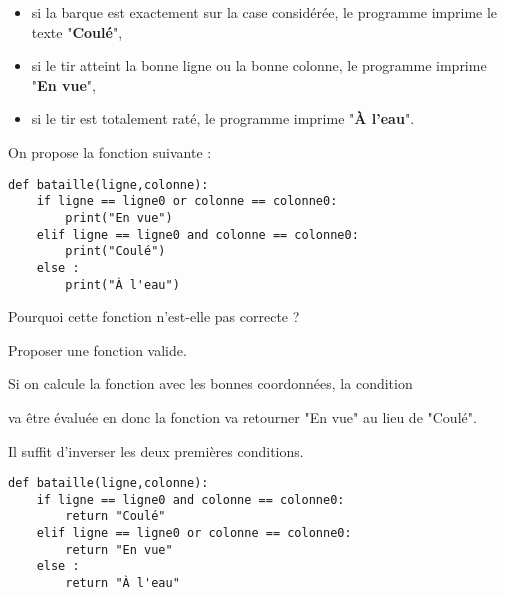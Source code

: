 \begin{itemize}
	\item si la barque est exactement sur la case considérée, le programme imprime le texte "{\bf Coulé}",
	\item si le tir atteint la bonne ligne ou la bonne colonne, le programme imprime "{\bf En vue}",
	\item si le tir est totalement raté, le programme imprime "{\bf À l'eau}".
\end{itemize}

On propose la fonction suivante :

\begin{lstlisting}
def bataille(ligne,colonne):
    if ligne == ligne0 or colonne == colonne0:
        print("En vue")
    elif ligne == ligne0 and colonne == colonne0:
        print("Coulé")
    else :
        print("À l'eau")
\end{lstlisting}
\begin{Exercise}[title=Correction]
Pourquoi cette fonction n'est-elle pas correcte ?

Proposer une fonction valide.
\end{Exercise}
\begin{Answer}
Si on calcule la fonction avec les bonnes coordonnées, la condition 
 
   va être évaluée en  donc la fonction va retourner "En vue" au lieu de "Coulé".

Il suffit d'inverser les deux premières conditions.
\begin{lstlisting}
def bataille(ligne,colonne):
    if ligne == ligne0 and colonne == colonne0:
        return "Coulé"
    elif ligne == ligne0 or colonne == colonne0:
        return "En vue"
    else :
        return "À l'eau"
\end{lstlisting}
\newpage
\end{Answer}
